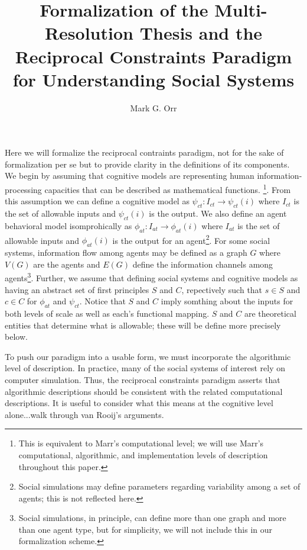 \documentclass{article}
\title{Formalization of the Multi-Resolution Thesis and the Reciprocal Constraints Paradigm for Understanding Social Systems}
\author{Mark G. Orr}
\begin{document}
\maketitle
Here we will formalize the reciprocal contraints paradigm, not for the sake of formalization per se but to provide clarity in the definitions of its components.  We begin by assuming that cognitive models are representing human information-processing capacities that can be described as mathematical functions. \cite{van Rooij, 2008}\footnote{This is equivalent to Marr's computational level; we will use Marr's computational, algorithmic, and implementation levels of description\cite{Marr,1981} throughout this paper.}. From this assumption we can define a cognitive model as $\psi_{ct}: I_{ct} \rightarrow \psi_{ct}(i)$ where $I_{ct}$ is the set of allowable inputs and $\psi_{ct}(i)$ is the output.  We also define an agent behavioral model isomprohically as $\phi_{at}: I_{at} \rightarrow \phi_{at}(i)$ where $I_{at}$ is the set of allowable inputs and $\phi_{at}(i)$ is the output for an agent\footnote{Social simulations may define parameters regarding variability among a set of agents; this is not reflected here.}.  For some social systems, information flow among agents may be defined as a graph $G$ where $V(G)$ are the agents and $E(G)$ define the information channels among agents\footnote{Social simulations, in principle, can define more than one graph and more than one agent type, but for simplicity, we will not include this in our formalization scheme.}. Further, we assume that defining social systems and cognitive models as having an abstract set of first principles $S$ and $C$, repectively such that $s \in S$ and $c \in C$ for $\phi_{at}$ and $\psi_{ct}$. Notice that $S$ and $C$ imply somthing about the inputs for both levels of scale as well as each's functional mapping.  $S$ and $C$ are theoretical entities that determine what is allowable; these will be define more precisely below.  

To push our paradigm into a usable form, we must incorporate the algorithmic level of description\cite{Marr}.  In practice, many of the social systems of interest rely on computer simulation.  Thus, the reciprocal constraints paradigm asserts that algorithmic descriptions should be consistent with the related computational descriptions.  It is useful to consider what this means at the cognitive level alone...walk through van Rooij's arguments. 
 

  
\end{document}
